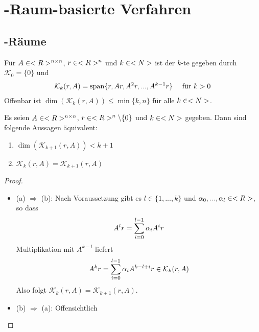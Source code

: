 \section{-Raum-basierte Verfahren}

\subsection{-Räume}

Für $A\in<R>^{n \times n}$, $r\in<R>^n$ und $k\in<N>$ ist der $k$-te  gegeben durch $\mathcal{K}_0=\{0\}$ und
\begin{align}
	\mathcal{K}_k(r,A) = \operatorname{span}\{r,Ar,A^2r,...,A^{k-1}r\}\quad\text{ für } k>0\notag
\end{align}
Offenbar ist $\dim(\mathcal{K}_k(r,A))\le\min\{k,n\}$ für alle $k\in<N>$.

\begin{lemma}
	Es seien $A\in<R>^{n \times n}$, $r\in<R>^n\backslash\{0\}$ und $k\in<N>$ gegeben. Dann sind folgende Aussagen äquivalent:
	\begin{enumerate}[label=(\alph*)]
		\item $\dim(\mathcal{K}_{k+1}(r,A))< k+1$
		\item $\mathcal{K}_k(r,A) = \mathcal{K}_{k+1}(r,A)$
	\end{enumerate}
\end{lemma}
\begin{proof}
	\begin{itemize}
		\item (a) $\Rightarrow$ (b): Nach Voraussetzung gibt es $l\in\{1,...,k\}$ und $\alpha_0,...,\alpha_l\in<R>$, so dass
		\begin{align}
			A^lr = \sum_{i=0}^{l-1} \alpha_iA^ir \notag
		\end{align}
		Multiplikation mit $A^{k-l}$ liefert
		\begin{align}
			A^kr = \sum_{i=0}^{l-1} \alpha_iA^{k-l+i}r\in\mathcal{K}_k(r,A)\notag
		\end{align}
		Also folgt $\mathcal{K}_k(r,A) = \mathcal{K}_{k+1}(r,A)$.
		\item (b) $\Rightarrow$ (a): Offensichtlich
	\end{itemize}
\end{proof}

